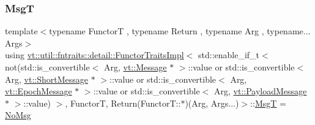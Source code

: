 \subsubsection{\texorpdfstring{MsgT}{MsgT}}
{\footnotesize\ttfamily template$<$typename FunctorT , typename Return , typename Arg , typename... Args$>$ \\
using \hyperlink{structvt_1_1util_1_1fntraits_1_1detail_1_1_functor_traits_impl}{vt\+::util\+::fntraits\+::detail\+::\+Functor\+Traits\+Impl}$<$ std\+::enable\+\_\+if\+\_\+t$<$ not(std\+::is\+\_\+convertible$<$ Arg, \hyperlink{namespacevt_a3a3ddfef40b4c90915fa43cdd5f129ea}{vt\+::\+Message} $\ast$ $>$\+::value or std\+::is\+\_\+convertible$<$ Arg, \hyperlink{namespacevt_a1125ac1da6c0bbf141e0ea0739d7602d}{vt\+::\+Short\+Message} $\ast$ $>$\+::value or std\+::is\+\_\+convertible$<$ Arg, \hyperlink{namespacevt_ad67368ffae52d7325002586b41bb150e}{vt\+::\+Epoch\+Message} $\ast$ $>$\+::value or std\+::is\+\_\+convertible$<$ Arg, \hyperlink{namespacevt_a89a92229c5622b855c02c549f83a1a68}{vt\+::\+Payload\+Message} $\ast$ $>$\+::value) $>$, FunctorT, Return(Functor\+T\+::$\ast$)(Arg, Args...)$>$\+::\hyperlink{structvt_1_1util_1_1fntraits_1_1detail_1_1_functor_traits_impl_3_01std_1_1enable__if__t_3_01not_ff7bf429a58012799da4cee5038d568d_a2edaf8a30b091e56906908ef1af1c0cc}{MsgT} =  \hyperlink{structvt_1_1util_1_1fntraits_1_1detail_1_1_no_msg}{No\+Msg}}

